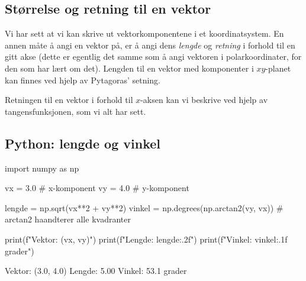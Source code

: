 \subsection{Størrelse og retning til en vektor}

Vi har sett at vi kan skrive ut vektorkomponentene i et koordinatsystem. En annen måte å angi en vektor på, er å angi dens \emph{lengde} og \emph{retning} i forhold til en gitt akse (dette er egentlig det samme som å angi vektoren i polarkoordinater, for den som har lært om det). Lengden til en vektor med komponenter i $xy$-planet kan finnes ved hjelp av Pytagoras' setning.

Retningen til en vektor i forhold til $x$-aksen kan vi beskrive ved hjelp av tangensfunksjonen, som vi alt har sett. 



\subsection*{Python: lengde og vinkel}

\begin{pythonkode}
import numpy as np

vx = 3.0    # x-komponent
vy = 4.0    # y-komponent

lengde = np.sqrt(vx**2 + vy**2)
vinkel = np.degrees(np.arctan2(vy, vx))  # arctan2 haandterer alle kvadranter

print(f"Vektor:  ({vx}, {vy})")
print(f"Lengde:  {lengde:.2f}")
print(f"Vinkel:  {vinkel:.1f} grader")
\end{pythonkode}
\begin{pythonoutput}
Vektor:  (3.0, 4.0)
Lengde:  5.00
Vinkel:  53.1 grader
\end{pythonoutput}

